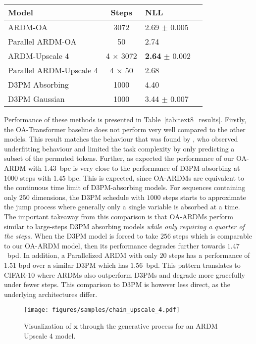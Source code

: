 \documentclass{article} \usepackage{iclr2022_conference,times}
\def\vx{{\bm{x}}}
\begin{document}
\begin{table}
\begin{minipage}[t]{.47\textwidth}
\begin{table}[H]
{\begin{tabular}{l c l l}
    \toprule
    Model & Steps & NLL \\ \midrule
       ARDM-OA & 3072 & 2.69 {\scriptsize$\pm$ 0.005} \\
       Parallel ARDM-OA & 50 & 2.74 \\ \midrule
       ARDM-Upscale 4 & 4 $\times$ 3072 & \textbf{2.64} {\scriptsize$\pm$ 0.002} \\  
       Parallel ARDM-Upscale 4 & 4 $\times$ 50 & 2.68 \\ \midrule
       D3PM Absorbing & 1000 & 4.40 \\
       D3PM Gaussian & 1000 & 3.44 {\scriptsize$\pm$ 0.007}\\ \bottomrule
    \end{tabular}}
\end{table}
\end{minipage}
\vspace{-.45cm} \end{table}

Performance of these methods is presented in Table~\ref{tab:text8_results}. Firstly, the OA-Transformer baseline does not perform very well compared to the other models. This result matches the behaviour that was found by \citet{yang2019xlnet}, who observed underfitting behaviour and limited the task complexity by only predicting a subset of the permuted tokens. Further, as expected the performance of our OA-ARDM with 1.43~bpc is very close to the performance of D3PM-absorbing at $1000$ steps with $1.45$ bpc. This is expected, since OA-ARDMs are equivalent to the continuous time limit of D3PM-absorbing models. For sequences containing only $250$ dimensions, the D3PM schedule with $1000$ steps starts to approximate the jump process where generally only a single variable is absorbed at a time. The important takeaway from this comparison is that OA-ARDMs perform similar to large-steps D3PM absorbing models \textit{while only requiring a quarter of the steps}. When the D3PM model is forced to take $256$ steps which is comparable to our OA-ARDM model, then its performance degrades further towards $1.47$~bpd. In addition, a Parallelized ARDM with only $20$ steps has a performance of $1.51$ bpd over a similar D3PM which has $1.56$~bpd. This pattern translates to CIFAR-10 \citep{krizhevsky2009learning} where ARDMs also outperform D3PMs and degrade more gracefully under fewer steps. This comparison to D3PM is however less direct, as the underlying architectures differ.

\begin{figure}
    \centering
    \vspace{-.2cm}
    \texttt{[image: figures/samples/chain\_upscale\_4.pdf]}
    \vspace{-.65cm}
    \caption{Visualization of $\vx$ through the generative process for an ARDM Upscale 4 model.}
    \label{fig:chain}
    \vspace{-.5cm}
\end{figure}
\end{document}
